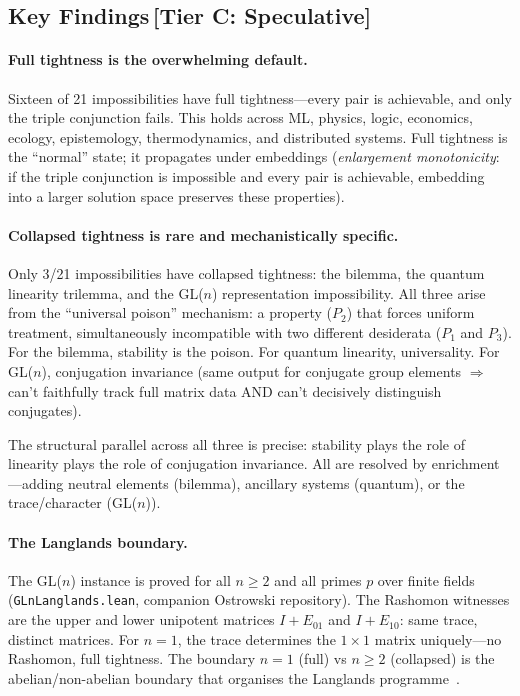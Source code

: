\documentclass[11pt,a4paper]{article}
\begin{document}
\subsection{Key Findings\,\textnormal{\normalsize[Tier C: Speculative]}}

\paragraph{Full tightness is the overwhelming default.}
Sixteen of 21 impossibilities have full tightness---every pair is achievable, and only the triple conjunction fails.  This holds across ML, physics, logic, economics, ecology, epistemology, thermodynamics, and distributed systems.  Full tightness is the ``normal'' state; it propagates under embeddings (\emph{enlargement monotonicity}: if the triple conjunction is impossible and every pair is achievable, embedding into a larger solution space preserves these properties).

\paragraph{Collapsed tightness is rare and mechanistically specific.}
Only 3/21 impossibilities have collapsed tightness: the bilemma, the quantum linearity trilemma, and the GL($n$) representation impossibility.  All three arise from the ``universal poison'' mechanism: a property ($P_2$) that forces uniform treatment, simultaneously incompatible with two different desiderata ($P_1$ and $P_3$).  For the bilemma, stability is the poison.  For quantum linearity, universality.  For GL($n$), conjugation invariance (same output for conjugate group elements $\Rightarrow$ can't faithfully track full matrix data AND can't decisively distinguish conjugates).

The structural parallel across all three is precise: stability plays the role of linearity plays the role of conjugation invariance.  All are resolved by enrichment---adding neutral elements (bilemma), ancillary systems (quantum), or the trace/character (GL($n$)).

\paragraph{The Langlands boundary.}
The GL($n$) instance is proved for all $n \geq 2$ and all primes $p$ over finite fields (\texttt{GLnLanglands.lean}, companion Ostrowski repository).  The Rashomon witnesses are the upper and lower unipotent matrices $I + E_{01}$ and $I + E_{10}$: same trace, distinct matrices.  For $n = 1$, the trace determines the $1 \times 1$ matrix uniquely---no Rashomon, full tightness.  The boundary $n = 1$ (full) vs $n \geq 2$ (collapsed) is the abelian/non-abelian boundary that organises the Langlands programme~\citep{langlands1970problems}.
\end{document}
